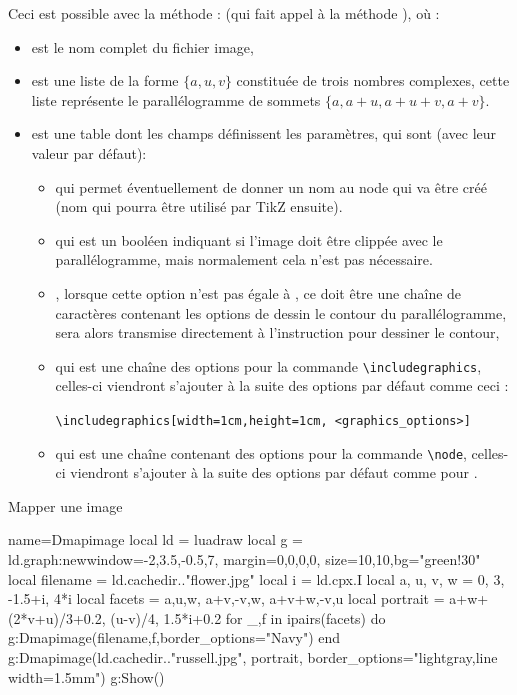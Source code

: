 Ceci est possible avec la méthode :  (qui fait appel à la méthode ), où :
\begin{itemize}
    \item  {} est le nom complet du fichier image, 
    \item {} est une liste de la forme $\{a,u,v\}$ constituée de trois nombres complexes, cette liste représente le parallélogramme de sommets $\{a,a+u,a+u+v,a+v\}$.
    \item {} est une table dont les champs définissent les paramètres, qui sont (avec leur valeur par défaut):
    \begin{itemize}
        \item {} qui permet éventuellement de donner un nom au node qui va être créé (nom qui pourra être utilisé par TikZ ensuite).
        
        \item {} qui est un booléen indiquant si l'image doit être clippée avec le parallélogramme, mais normalement cela n'est pas nécessaire.
        
        \item {}, lorsque cette option n'est pas égale à \nil, ce doit être une chaîne de caractères contenant les options de dessin le contour du parallélogramme,  sera alors transmise directement à l'instruction \drawcmd pour dessiner le contour,
        
        \item {} qui est une chaîne des options pour la commande \verb|\includegraphics|, celles-ci viendront s'ajouter à la suite des options par défaut comme ceci :\par
        \hfil\verb|\includegraphics[width=1cm,height=1cm, <graphics_options>]|\hfil
        
        \item {} qui est une chaîne contenant des options pour la commande \verb|\node|, celles-ci viendront s'ajouter à la suite des options par défaut comme pour .
    \end{itemize}    
\end{itemize}

\begin{demo}{Mapper une image}
\begin{luadraw}{name=Dmapimage}
local ld = luadraw
local g = ld.graph:new{window={-2,3.5,-0.5,7}, margin={0,0,0,0}, size={10,10},bg="green!30"}
local filename = ld.cachedir.."flower.jpg"
local i = ld.cpx.I
local a, u, v, w = 0, 3, -1.5+i, 4*i
local facets = {{a,u,w}, {a+v,-v,w}, {a+v+w,-v,u} }
local portrait = {a+w+(2*v+u)/3+0.2, (u-v)/4, 1.5*i+0.2}
for _,f in ipairs(facets) do
    g:Dmapimage(filename,f,{border_options="Navy"})
end
g:Dmapimage(ld.cachedir.."russell.jpg", portrait, {border_options="lightgray,line width=1.5mm"})
g:Show()
\end{luadraw}
\end{demo}

